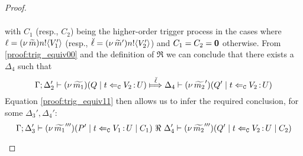 \begin{proof}
\begin{enumerate}[1.]
\begin{enumerate}
\begin{eqnarray}
							\label{proof:trig_equiv11}
						\end{eqnarray}
							with $C_1$ (resp., $C_2$) being the higher-order trigger process
							in the cases where $\ell = (\nu\, \widetilde{m}) n ! \langle V_1' \rangle$ (resp., $\breve{\ell} = (\nu\, \widetilde{m}') n ! \langle V_2' \rangle$)
							and $C_1 = C_2 = \mathbf{0}$ otherwise.
							From \eqref{proof:trig_equiv00} and the definition of $\Re$
							we can conclude that there exists a $ \Delta_4$ such that
						\[
							\horel{\Gamma}{\Delta_2'}{\newsp{\widetilde{m_1}}{Q \Par \ftrigger{t}{V_2}{U}}}
							{\Hby{\mact{\ell}}}
							{\Delta_4}{\newsp{\widetilde{m_2}'}{Q' \Par \ftrigger{t}{V_2}{U}}}
						\]
							Equation \eqref{proof:trig_equiv11} then allows us to infer the required conclusion, for some $\Delta_3', \Delta_4'$:
						\[
							\Gamma; \Delta_3' \vdash (\nu\, \widetilde{m_1}''')(P' \;|\; t \Leftarrow_{\mathtt{C}} V_1{\,:\,}U \;|\; C_1) \ \Re\  \Delta_4' \vdash (\nu\, \widetilde{m_2}''')(Q' \;|\; t \Leftarrow_{\mathtt{C}} V_2{\,:\,}U \;|\; C_2)
						\]


\end{enumerate}
\end{enumerate}
\end{proof}
